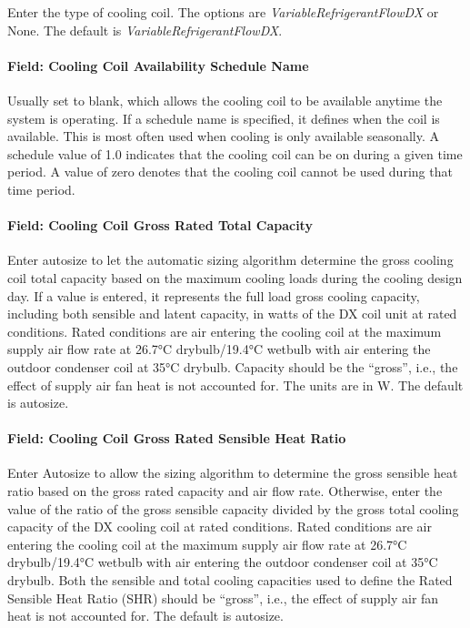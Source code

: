 Enter the type of cooling coil. The options are \emph{VariableRefrigerantFlowDX} or None. The default is \emph{VariableRefrigerantFlowDX}.

\paragraph{Field: Cooling Coil Availability Schedule Name}\label{field-cooling-coil-availability-schedule-name-3}

Usually set to blank, which allows the cooling coil to be available anytime the system is operating. If a schedule name is specified, it defines when the coil is available. This is most often used when cooling is only available seasonally. A schedule value of 1.0 indicates that the cooling coil can be on during a given time period. A value of zero denotes that the cooling coil cannot be used during that time period.

\paragraph{Field: Cooling Coil Gross Rated Total Capacity}\label{field-cooling-coil-gross-rated-total-capacity-3}

Enter autosize to let the automatic sizing algorithm determine the gross cooling coil total capacity based on the maximum cooling loads during the cooling design day. If a value is entered, it represents the full load gross cooling capacity, including both sensible and latent capacity, in watts of the DX coil unit at rated conditions. Rated conditions are air entering the cooling coil at the maximum supply air flow rate at 26.7°C drybulb/19.4°C wetbulb with air entering the outdoor condenser coil at 35°C drybulb. Capacity should be the ``gross'', i.e., the effect of supply air fan heat is not accounted for. The units are in W. The default is autosize.

\paragraph{Field: Cooling Coil Gross Rated Sensible Heat Ratio}\label{field-cooling-coil-gross-rated-sensible-heat-ratio-3}

Enter Autosize to allow the sizing algorithm to determine the gross sensible heat ratio based on the gross rated capacity and air flow rate. Otherwise, enter the value of the ratio of the gross sensible capacity divided by the gross total cooling capacity of the DX cooling coil at rated conditions. Rated conditions are air entering the cooling coil at the maximum supply air flow rate at 26.7°C drybulb/19.4°C wetbulb with air entering the outdoor condenser coil at 35°C drybulb. Both the sensible and total cooling capacities used to define the Rated Sensible Heat Ratio (SHR) should be ``gross'', i.e., the effect of supply air fan heat is not accounted for. The default is autosize.

